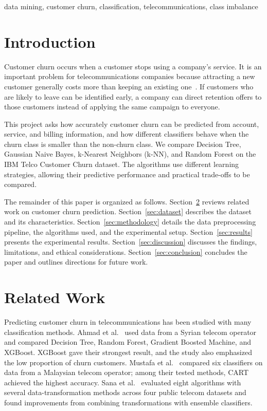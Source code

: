 \documentclass[conference]{IEEEtran}
\begin{document}
	\begin{IEEEkeywords}
		data mining, customer churn, classification, telecommunications, class imbalance
	\end{IEEEkeywords}
	
	\section{Introduction}
	\label{sec:introduction}
	
	Customer churn occurs when a customer stops using a company's service. It is an important problem for telecommunications companies because attracting a new customer generally costs more than keeping an existing one~\cite{b2}. If customers who are likely to leave can be identified early, a company can direct retention offers to those customers instead of applying the same campaign to everyone.
	
	This project asks how accurately customer churn can be predicted from account, service, and billing information, and how different classifiers behave when the churn class is smaller than the non-churn class. We compare Decision Tree, Gaussian Naive Bayes, k-Nearest Neighbors (k-NN), and Random Forest on the IBM Telco Customer Churn dataset. The algorithms use different learning strategies, allowing their predictive performance and practical trade-offs to be compared.
	
	The remainder of this paper is organized as follows. Section~\ref{sec:related_work} reviews related work on customer churn prediction. Section~\ref{sec:dataset} describes the dataset and its characteristics. Section~\ref{sec:methodology} details the data preprocessing pipeline, the algorithms used, and the experimental setup. Section~\ref{sec:results} presents the experimental results. Section~\ref{sec:discussion} discusses the findings, limitations, and ethical considerations. Section~\ref{sec:conclusion} concludes the paper and outlines directions for future work.
	
	\section{Related Work}
	\label{sec:related_work}
	
	Predicting customer churn in telecommunications has been studied with many classification methods. Ahmad et al.~\cite{b1} used data from a Syrian telecom operator and compared Decision Tree, Random Forest, Gradient Boosted Machine, and XGBoost. XGBoost gave their strongest result, and the study also emphasized the low proportion of churn customers. Mustafa et al.~\cite{b2} compared six classifiers on data from a Malaysian telecom operator; among their tested methods, CART achieved the highest accuracy. Sana et al.~\cite{b3} evaluated eight algorithms with several data-transformation methods across four public telecom datasets and found improvements from combining transformations with ensemble classifiers.
\end{document}
